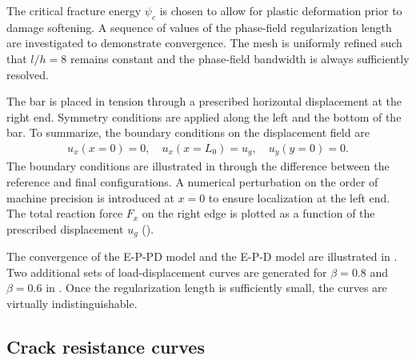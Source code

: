 The critical fracture energy $\psi_c$ is chosen to allow for plastic deformation prior to damage softening. A sequence of values of the phase-field regularization length are investigated to demonstrate convergence. The mesh is uniformly refined such that $l/h = 8$ remains constant and the phase-field bandwidth is always sufficiently resolved.



The bar is placed in tension through a prescribed horizontal displacement at the right end. Symmetry conditions are applied along the left and the bottom of the bar.  To summarize, the boundary conditions on the displacement field are
\begin{align*}
  u_x(x = 0) = 0, \quad u_x(x = L_0) = u_g, \quad u_y(y = 0) = 0.
\end{align*}
The boundary conditions are illustrated in  through the difference between the reference and final configurations. A numerical perturbation on the order of machine precision is introduced at $x=0$ to ensure localization at the left end. The total reaction force $F_x$ on the right edge is plotted as a function of the prescribed displacement $u_g$ ().

The convergence of the E-P-PD model and the E-P-D model are illustrated in .
Two additional sets of load-displacement curves are generated for $\beta = 0.8$ and $\beta = 0.6$ in . Once the regularization length is sufficiently small, the curves are virtually indistinguishable.


\subsection{Crack resistance curves}
